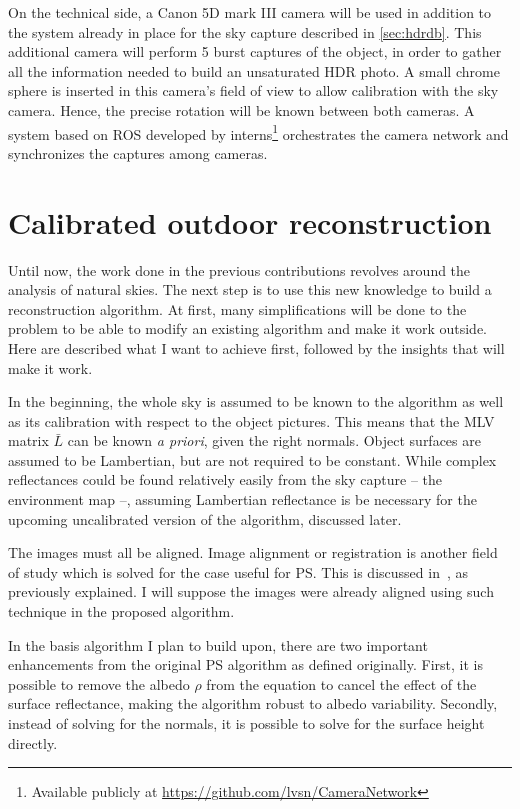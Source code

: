 On the technical side, a Canon 5D mark III camera will be used in addition to the system already in place for the sky capture described in \ref{sec:hdrdb}. This additional camera will perform 5 burst captures of the object, in order to gather all the information needed to build an unsaturated HDR photo. A small chrome sphere is inserted in this camera's field of view to allow calibration with the sky camera. Hence, the precise rotation will be known between both cameras. A system based on ROS developed by interns\footnote{Available publicly at \url{https://github.com/lvsn/CameraNetwork}} orchestrates the camera network and synchronizes the captures among cameras.


\section{Calibrated outdoor reconstruction}
\label{sec:calib}

Until now, the work done in the previous contributions revolves around the analysis of natural skies. The next step is to use this new knowledge to build a reconstruction algorithm. At first, many simplifications will be done to the problem to be able to modify an existing algorithm and make it work outside. Here are described what I want to achieve first, followed by the insights that will make it work.

In the beginning, the whole sky is assumed to be known to the algorithm as well as its calibration with respect to the object pictures. This means that the MLV matrix $\bar{L}$ can be known \emph{a priori}, given the right normals. Object surfaces are assumed to be Lambertian, but are not required to be constant. While complex reflectances could be found relatively easily from the sky capture -- the environment map --, assuming Lambertian reflectance is be necessary for the upcoming uncalibrated version of the algorithm, discussed later.

The images must all be aligned. Image alignment or registration is another field of study which is solved for the case useful for PS. This is discussed in~\cite{ackermann-cvpr-12}, as previously explained. I will suppose the images were already aligned using such technique in the proposed algorithm.

In the basis algorithm I plan to build upon, there are two important enhancements from the original PS algorithm as defined originally. First, it is possible to remove the albedo $\rho$ from the equation to cancel the effect of the surface reflectance, making the algorithm robust to albedo variability. Secondly, instead of solving for the normals, it is possible to solve for the surface height directly. 

